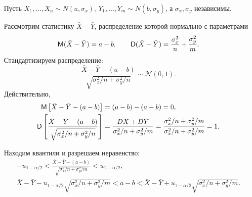 \begin{ex}
Пусть $X_1, \dots, X_n \sim N(a, \sigma_x)$, $Y_1, \dots, Y_m \sim N(b,
\sigma_y)$, а $\sigma_x, \sigma_y$ независимы.

Рассмотрим статистику $ \bar X - \bar Y $, распределение которой нормально с
параметрами  
\[
		\mathsf M (\bar X - \bar Y) = a - b, \qquad \mathsf D(\bar X - \bar Y) =
		\frac{\sigma_x^2}{n} + \frac{\sigma_y^2}{m}.
\]
Стандартизируем распределение:
\[
  \frac{\bar X - \bar Y - (a-b)}{\sqrt{\sigma_x^2/n +
	\sigma_y^2/n}} \sim \mathscr N(0, 1).
\]
Действительно,
\begin{align*}
	\mathsf M\left[\bar X - \bar Y - \left(a-b\right)\right] &= (a-b) - (a-b) = 0, \\
  \mathsf D\left[\frac{\bar X - \bar Y - (a-b)}{\sqrt{\sigma_x^2/n +
\sigma_y^2/n}}\right] &= \frac{D \bar X + D \bar Y}{\sigma_x^2 / n +
\sigma_y^2 / m} = \frac{\sigma_x^2 / n + \sigma_y^2 / m}{\sigma_x^2 / n +
\sigma_y^2 / m} = 1.
\end{align*}

Находим квантили и разрешаем неравенство:
\begin{gather*}
  - u_{1-\alpha/2} < \frac{\bar X - \bar Y - (a-b)}{\sqrt{\sigma_x^2 / n +
	\sigma_y^2 / m}} < u_{1-\alpha/2}, \\
  \bar X - \bar Y - u_{1-\alpha/2} \sqrt{\sigma_x^2 / n + \sigma_y^2 / m}< a-b <
	\bar X - \bar Y + u_{1-\alpha/2} \sqrt{\sigma_x^2 / n + \sigma_y^2 / m}.
\end{gather*}
\end{ex}

